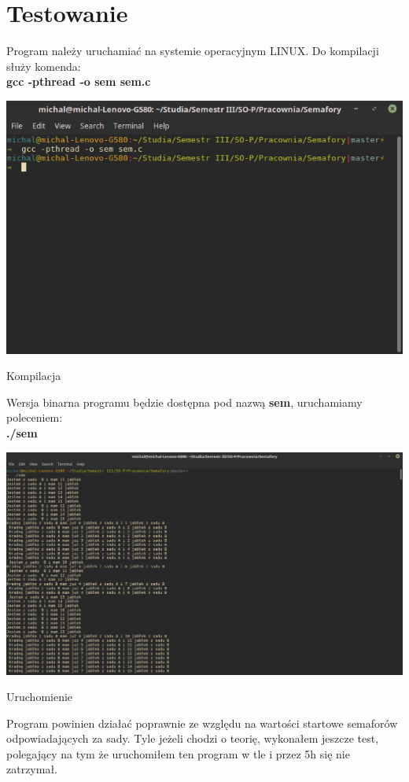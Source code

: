 \documentclass{article}
\begin{document}
\section{Testowanie}
Program należy uruchamiać na systemie operacyjnym LINUX. Do kompilacji służy komenda: \\
\textbf{gcc -pthread -o sem sem.c  } \\ 
\begin{center}
\includegraphics[width=\textwidth]{kompilacja} 
\caption{Kompilacja}
\end{center}
Wersja binarna programu będzie dostępna pod nazwą \textbf{sem}, uruchamiamy poleceniem: \\
\textbf{./sem}
\begin{center}
\includegraphics[width=\textwidth]{uruchomienie} 
\caption{Uruchomienie}
\end{center}
Program powinien działać poprawnie ze względu na wartości startowe semaforów odpowiadających za sady. Tyle jeżeli chodzi o teorię, wykonałem jeszcze test, polegający na tym że uruchomiłem ten program w tle i przez 5h się nie zatrzymał.
\end{document}
